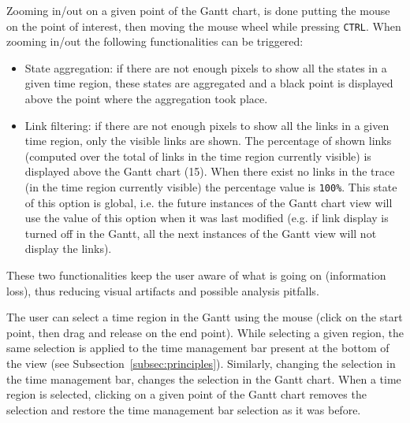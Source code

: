 \documentclass[twoside]{article}
\begin{document}
\begin{sloppypar}
Zooming in/out on a given point of the Gantt chart, is done putting the mouse on the point of interest, then moving the mouse wheel while pressing \texttt{CTRL}.
When zooming in/out the following functionalities can be triggered:
\begin{itemize}
 \item State aggregation: if there are not enough pixels to show all the states in a given time region, these states are aggregated and a black point is displayed above the point where the aggregation took place. 
 \item Link filtering: if there are not enough pixels to show all the links in a given time region, only the visible links are shown. 
 The percentage of shown links (computed over the total of links in the time region currently visible) is displayed above the Gantt chart (\num{15}).
 When there exist no links in the trace (in the time region currently visible) the percentage value is \texttt{100\%}. This state of this option is global, i.e. the future instances of the Gantt chart view will use the value of this option when it was last modified (e.g. if link display is turned off in the Gantt, all the next instances of the Gantt view will not display the links). 
\end{itemize}
These two functionalities keep the user aware of what is going on (information loss), thus reducing visual artifacts and possible analysis pitfalls.

The user can select a time region in the Gantt using the mouse (click on the start point, then drag and release on the end point). 
While selecting a given region, the same selection is applied to the time management bar present at the bottom of the view (see Subsection~\ref{subsec:principles}).
Similarly, changing the selection in the time management bar, changes the selection in the Gantt chart.
When a time region is selected, clicking on a given point of the Gantt chart removes the selection and restore the time management bar selection as it was before.


\end{sloppypar}
\end{document}
